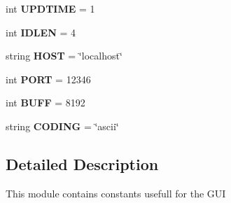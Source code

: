 \begin{DoxyCompactItemize}
\item 
\hypertarget{namespaceconst_ab48e7cdb3e9f4ff7a3df5bba609b34ce}{int {\bfseries \-U\-P\-D\-T\-I\-M\-E} = 1}\label{namespaceconst_ab48e7cdb3e9f4ff7a3df5bba609b34ce}

\item 
\hypertarget{namespaceconst_a5be05d35ec9c1423e28eb959ea40a690}{int {\bfseries \-I\-D\-L\-E\-N} = 4}\label{namespaceconst_a5be05d35ec9c1423e28eb959ea40a690}

\item 
\hypertarget{namespaceconst_a3bc8907e5a0d2daafa4c65abda9ca1de}{string {\bfseries \-H\-O\-S\-T} = \char`\"{}localhost\char`\"{}}\label{namespaceconst_a3bc8907e5a0d2daafa4c65abda9ca1de}

\item 
\hypertarget{namespaceconst_a8b7101ff60f650a74df4d42e1aede8cc}{int {\bfseries \-P\-O\-R\-T} = 12346}\label{namespaceconst_a8b7101ff60f650a74df4d42e1aede8cc}

\item 
\hypertarget{namespaceconst_ae2ffe710efe83d64d01aa19bc6f58d8b}{int {\bfseries \-B\-U\-F\-F} = 8192}\label{namespaceconst_ae2ffe710efe83d64d01aa19bc6f58d8b}

\item 
\hypertarget{namespaceconst_a83ec13e99ebe04fb8e610c888b09834c}{string {\bfseries \-C\-O\-D\-I\-N\-G} = \char`\"{}ascii\char`\"{}}\label{namespaceconst_a83ec13e99ebe04fb8e610c888b09834c}

\end{DoxyCompactItemize}


\subsection{\-Detailed \-Description}
\begin{DoxyVerb}
    This module contains constants usefull for the GUI
\end{DoxyVerb}
 